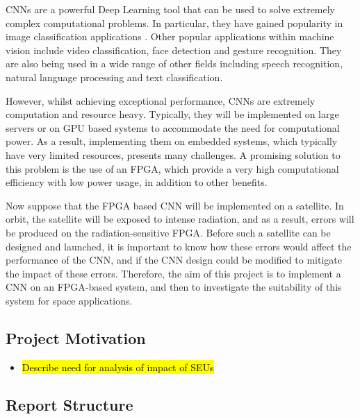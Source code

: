 \documentclass[12pt]{article}
\begin{document}
CNNs are a powerful Deep Learning tool that can be used to solve extremely complex computational problems. In particular, they have gained popularity in image classification applications \cite{ImageNetChallenge}. Other popular applications within machine vision include video classification, face detection and gesture recognition. They are also being used in a wide range of other fields including speech recognition, natural language processing and text classification.

However, whilst achieving exceptional performance, CNNs are extremely computation and resource heavy. Typically, they will be implemented on large servers or on GPU based systems to accommodate the need for computational power. As a result, implementing them on embedded systems, which typically have very limited resources, presents many challenges. A promising solution to this problem is the use of an FPGA, which provide a very high computational efficiency with low power usage, in addition to other benefits.

Now suppose that the FPGA based CNN will be implemented on a satellite. In orbit, the satellite will be exposed to intense radiation, and as a result, errors will be produced on the radiation-sensitive FPGA. Before such a satellite can be designed and launched, it is important to know how these errors would affect the performance of the CNN, and if the CNN design could be modified to mitigate the impact of these errors. Therefore, the aim of this project is to implement a CNN on an FPGA-based system, and then to investigate the suitability of this system for space applications.

\subsection{Project Motivation}
\label{sec:Intro-ProjectMotivation}
\vspace{-12pt}

\begin{itemize}
\item \hl{Describe need for analysis of impact of SEUs}
\end{itemize}

\vspace{-12pt}
\subsection{Report Structure}
\label{sec:Intro-Structure}
\vspace{-12pt}
\end{document}
